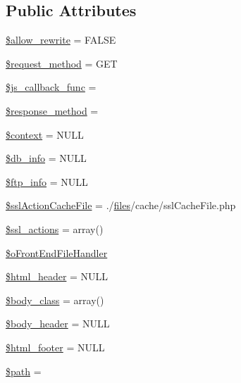 \subsection*{Public Attributes}
\begin{DoxyCompactItemize}
\item 
\hyperlink{classContext_a24355a0c151bd3285c45254f773af275}{\$allow\+\_\+rewrite} = F\+A\+L\+SE
\item 
\hyperlink{classContext_a1e80f487f65708456eb17be0024aee50}{\$request\+\_\+method} = \textquotesingle{}G\+ET\textquotesingle{}
\item 
\hyperlink{classContext_afddd5e6374a20b88466dfd1cb6f32d62}{\$js\+\_\+callback\+\_\+func} = \textquotesingle{}\textquotesingle{}
\item 
\hyperlink{classContext_a383836fb81ee24d673c7145e4d2eb030}{\$response\+\_\+method} = \textquotesingle{}\textquotesingle{}
\item 
\hyperlink{classContext_a39e9103dacbca5e5fa49d6e93f0ccec3}{\$context} = N\+U\+LL
\item 
\hyperlink{classContext_a6f4d307bdcb4bfd83fda27bc265977eb}{\$db\+\_\+info} = N\+U\+LL
\item 
\hyperlink{classContext_a8b9cb334c451f773d75db73b01f86ccc}{\$ftp\+\_\+info} = N\+U\+LL
\item 
\hyperlink{classContext_a5554b6376a0703ebfbdf2bf79800bfee}{\$ssl\+Action\+Cache\+File} = \textquotesingle{}./\hyperlink{popup_8min_8js_a0742cac2750bccc2d88ac080fb9daa22}{files}/cache/ssl\+Cache\+File.\+php\textquotesingle{}
\item 
\hyperlink{classContext_a9f8d33aa42d3851da1134d3ba2fbf009}{\$ssl\+\_\+actions} = array()
\item 
\hyperlink{classContext_a55e855769152e53af5e2ecb9b889c7f6}{\$o\+Front\+End\+File\+Handler}
\item 
\hyperlink{classContext_ab0146079ffcc658bbe5bbf4ba7b8e934}{\$html\+\_\+header} = N\+U\+LL
\item 
\hyperlink{classContext_af0bb833a3157d6d2153d7858cb60e435}{\$body\+\_\+class} = array()
\item 
\hyperlink{classContext_aa2c90f49a1f6389eadea8962d0fbf5b3}{\$body\+\_\+header} = N\+U\+LL
\item 
\hyperlink{classContext_ad55e79b648659c59512e02a6c0d349ff}{\$html\+\_\+footer} = N\+U\+LL
\item 
\hyperlink{classContext_a0752e74e1ec01a4fd63c044a1d3bd28b}{\$path} = \textquotesingle{}\textquotesingle{}
\item 

\end{DoxyCompactItemize}
